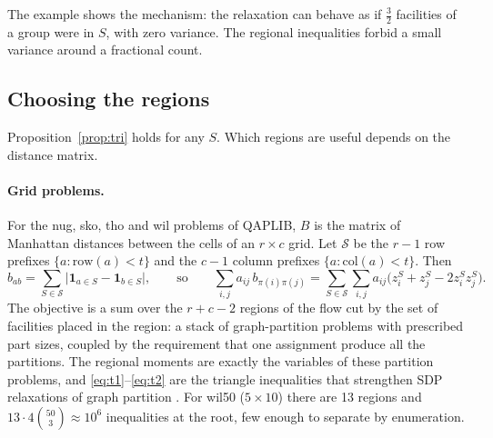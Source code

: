 \documentclass[11pt]{article}
\theoremstyle{remark}
\begin{document}
The example shows the mechanism: the relaxation can behave as if $\frac32$
facilities of a group were in $S$, with zero variance. The regional inequalities
forbid a small variance around a fractional count.

\subsection{Choosing the regions}\label{sec:regions}

Proposition~\ref{prop:tri} holds for any $S$. Which regions are useful depends on
the distance matrix.

\paragraph{Grid problems.} For the nug, sko, tho and wil problems of QAPLIB, $B$
is the matrix of Manhattan distances between the cells of an $r\times c$ grid.
Let $\mathcal{S}$ be the $r-1$ row prefixes $\{a : \mathrm{row}(a) < t\}$ and the
$c-1$ column prefixes $\{a: \mathrm{col}(a) < t\}$. Then
\begin{equation}\label{eq:decomp}
  b_{ab} = \sum_{S\in\mathcal{S}} \big|\mathbf{1}_{a\in S} - \mathbf{1}_{b\in S}\big|,
  \qquad\text{so}\qquad
  \sum_{i,j} a_{ij}\,b_{\pi(i)\pi(j)} = \sum_{S\in\mathcal{S}}\sum_{i,j} a_{ij}\big(z_i^S + z_j^S - 2z_i^Sz_j^S\big).
\end{equation}
The objective is a sum over the $r + c - 2$ regions of the flow cut by the set of
facilities placed in the region: a stack of graph-partition problems with
prescribed part sizes, coupled by the requirement that one assignment produce all
the partitions. The regional moments are exactly the variables of these partition
problems, and \eqref{eq:t1}--\eqref{eq:t2} are the triangle inequalities that
strengthen SDP relaxations of graph partition
\cite{dmswz}. For wil50 ($5\times10$) there are 13 regions and
$13\cdot4\binom{50}{3}\approx10^6$ inequalities at the root, few enough to
separate by enumeration.
\end{document}
